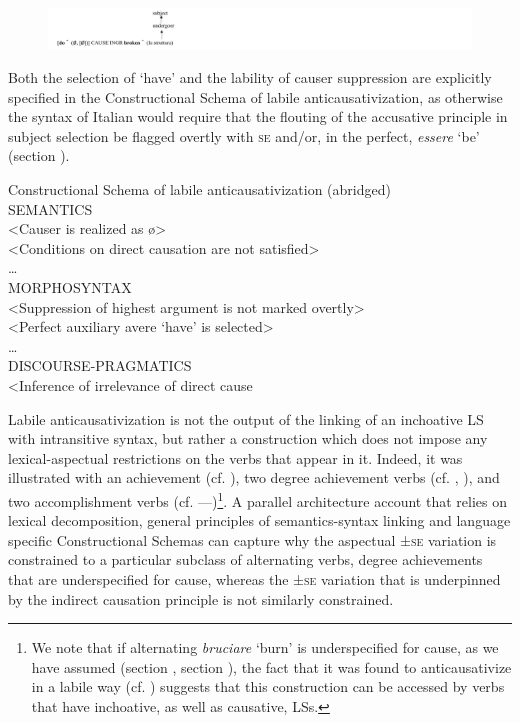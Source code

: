 \documentclass[output=paper,colorlinks,citecolor=brown
]{langscibook}
\begin{document}
\begin{figure}
\centering
\includegraphics[width=2\textwidth]{figures/bentley_figure4.png}
\caption{}
\label{fig:bentley_figure_4}
\end{figure}    

Both the selection of ‘have’ and the lability of causer suppression are explicitly specified in the Constructional Schema of labile anticausativization, as otherwise the syntax of Italian would require that the flouting of the accusative principle in subject selection be flagged overtly with \textsc{se} and/or, in the perfect, \textit{essere} ‘be’ (section ).

\ea  \label{bentley_example_60}
Constructional Schema of labile anticausativization (abridged)\\
SEMANTICS\\
<Causer is realized as \o>\\
<Conditions on direct causation are not satisfied>\\
 \ldots \\
MORPHOSYNTAX\\
<Suppression of highest argument is not marked overtly>\\
<Perfect auxiliary avere ‘have’ is selected>\\
 \ldots \\
DISCOURSE-PRAGMATICS\\
<Inference of irrelevance of direct cause
\z

Labile anticausativization is not the output of the linking of an inchoative LS with intransitive syntax, but rather a construction which does not impose any lexical-aspectual restrictions on the verbs that appear in it. Indeed, it was illustrated with an achievement (cf. ), two degree achievement verbs (cf. , ), and two accomplishment verbs (cf. —)\footnote{We note that if alternating \textit{bruciare} ‘burn’ is underspecified for cause, as we have assumed (section , section ), the fact that it was found to anticausativize in a labile way (cf. ) suggests that this construction can be accessed by verbs that have inchoative, as well as causative, LSs.}.  A parallel architecture account that relies on lexical decomposition, general principles of semantics-syntax linking and language specific Constructional Schemas can capture why the aspectual ±\textsc{se} variation is constrained to a particular subclass of alternating verbs, degree achievements that are underspecified for cause, whereas the ±\textsc{se} variation that is underpinned by the indirect causation principle is not similarly constrained.  
\end{document}
